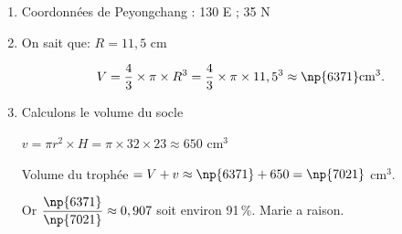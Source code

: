 
\medskip

\begin{enumerate}
\item Coordonnées de Peyongchang : 130\degres{}  E ; 35\degres{} N
\item On sait que: $R = 11,5$ cm

\[V = \dfrac{4}{3} \times  \pi \times  R^3 =  \dfrac{4}{3} \times  \pi \times   11,5^3 \approx \np{6371} \text{cm}^3.\]

\item Calculons le volume du socle

$v = \pi r^2 \times H = \pi \times 32 \times 23 \approx 650$ cm$^3$

Volume du trophée $= V + v \approx \np{6371} + 650 = \np{7021}$ cm$^3$.

Or $\dfrac{\np{6371}}{\np{7021}}\approx  0,907$ soit environ 91\,\%. Marie a raison.
\end{enumerate}

\bigskip

